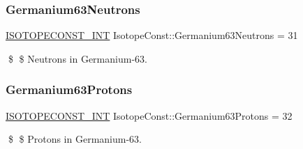 \subsubsection{\texorpdfstring{Germanium63\+Neutrons}{Germanium63Neutrons}}
{\footnotesize\ttfamily \mbox{\hyperlink{group___isotope_const-_macros_ga5f18360b3e99483a35c32d789e62621c}{I\+S\+O\+T\+O\+P\+E\+C\+O\+N\+S\+T\+\_\+\+I\+NT}} Isotope\+Const\+::\+Germanium63\+Neutrons = 31}

\$ \$ Neutrons in Germanium-\/63. \mbox{\label{group___isotope_const-_germanium-_ge63_gab485852c64e300f2068cba68ffced4aa}} 
\subsubsection{\texorpdfstring{Germanium63\+Protons}{Germanium63Protons}}
{\footnotesize\ttfamily \mbox{\hyperlink{group___isotope_const-_macros_ga5f18360b3e99483a35c32d789e62621c}{I\+S\+O\+T\+O\+P\+E\+C\+O\+N\+S\+T\+\_\+\+I\+NT}} Isotope\+Const\+::\+Germanium63\+Protons = 32}

\$ \$ Protons in Germanium-\/63. 